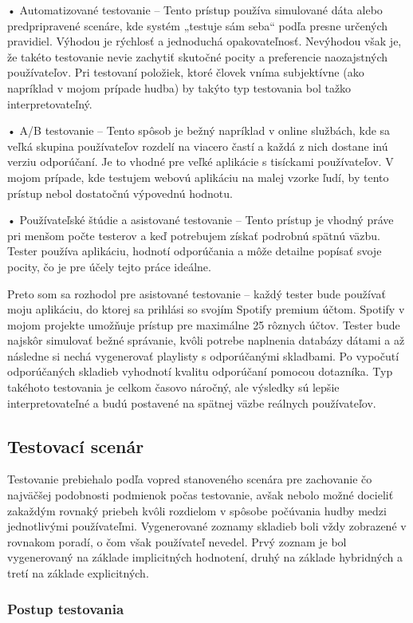     •	Automatizované testovanie – Tento prístup používa simulované dáta alebo predpripravené scenáre, kde systém „testuje sám seba“ podľa presne určených pravidiel. Výhodou je rýchlosť a jednoduchá opakovateľnosť. Nevýhodou však je, že takéto testovanie nevie zachytiť skutočné pocity a preferencie naozajstných používateľov. Pri testovaní položiek, ktoré človek vníma subjektívne (ako napríklad v mojom prípade hudba) by takýto typ testovania bol tažko interpretovateľný.

    •	A/B testovanie – Tento spôsob je bežný napríklad v online službách, kde sa veľká skupina používateľov rozdelí na viacero častí a každá z nich dostane inú verziu odporúčaní. Je to vhodné pre veľké aplikácie s tisíckami používateľov. V mojom prípade, kde testujem webovú aplikáciu na malej vzorke ľudí, by tento prístup nebol dostatočnú výpovednú hodnotu.

    •	Používateľské štúdie a asistované testovanie – Tento prístup je vhodný práve pri menšom počte testerov a keď potrebujem získať podrobnú spätnú väzbu. Tester používa aplikáciu, hodnotí odporúčania a môže detailne popísať svoje pocity, čo je pre účely tejto práce ideálne.

Preto som sa rozhodol pre asistované testovanie – každý tester bude používať moju aplikáciu, do ktorej sa prihlási so svojím Spotify premium účtom. Spotify v mojom projekte umožňuje prístup pre maximálne 25 rôznych účtov. Tester bude najskôr simulovať bežné správanie, kvôli potrebe naplnenia databázy dátami a až následne si nechá vygenerovať playlisty s odporúčanými skladbami. Po vypočutí odporúčaných skladieb vyhodnotí kvalitu odporúčaní pomocou dotazníka. Typ takéhoto testovania je celkom časovo náročný, ale výsledky sú lepšie interpretovateľné a budú postavené na spätnej väzbe reálnych používateľov.

\subsection{Testovací scenár}
Testovanie prebiehalo podľa vopred stanoveného scenára pre zachovanie čo najväčšej podobnosti podmienok počas testovanie, avšak nebolo možné docieliť zakaždým rovnaký priebeh kvôli rozdielom v spôsobe počúvania hudby medzi jednotlivými používateľmi. Vygenerované zoznamy skladieb boli vždy zobrazené v rovnakom poradí, o čom však používateľ nevedel. Prvý zoznam je bol vygenerovaný na základe implicitných hodnotení, druhý na základe hybridných a tretí na základe explicitných. 

\subsubsection{Postup testovania}


